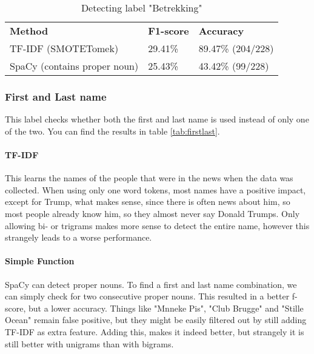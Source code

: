 \documentclass{article}
\begin{document}
\begin{table}[]
\begin{tabular}{lll}
\textbf{Method}            & \textbf{F1-score} & \textbf{Accuracy} \\
TF-IDF (SMOTETomek)        & 29.41\%           & 89.47\% (204/228) \\
SpaCy (contains proper noun) & 25.43\%           & 43.42\% (99/228)
\end{tabular}\caption{Detecting label "Betrekking"}
\label{tab:adress}
\end{table}

\subsubsection{First and Last name}
This label checks whether both the first and last name is used instead of only one of the two. \cite{soubry} You can find the results in table \ref{tab:firstlast}.

\paragraph{TF-IDF} This learns the names of the people that were in the news when the data was collected. When using only one word tokens, most names have a positive impact, except for Trump, what makes sense, since there is often news about him, so most people already know him, so they almost never say Donald Trumps. Only allowing bi- or trigrams makes more sense to detect the entire name, however this strangely leads to a worse performance.

\paragraph{Simple Function} SpaCy can detect proper nouns. To find a first and last name combination, we can simply check for two consecutive proper nouns. This resulted in a better f-score, but a lower accuracy. Things like "Mnneke Pis", "Club Brugge" and "Stille Ocean" remain false positive, but they might be easily filtered out by still adding TF-IDF as extra feature. Adding this, makes it indeed better, but strangely it is still better with unigrams than with bigrams.
\end{document}
